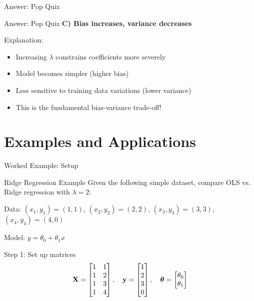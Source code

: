 \documentclass{beamer}
\begin{document}
\begin{frame}{Answer: Pop Quiz \thepopquiz}
\begin{popquizbox}{Answer: Pop Quiz \thepopquiz}
\textbf{C) Bias increases, variance decreases}

\vspace{0.3cm}
Explanation:
\begin{itemize}
\item Increasing $\lambda$ constrains coefficients more severely
\item Model becomes simpler (higher bias)
\item Less sensitive to training data variations (lower variance)
\item This is the fundamental bias-variance trade-off!
\end{itemize}
\end{popquizbox}
\end{frame}

\section{Examples and Applications}

\begin{frame}{Worked Example: Setup}
\begin{examplebox}{Ridge Regression Example}
Given the following simple dataset, compare OLS vs. Ridge regression with $\lambda = 2$:

\vspace{0.3cm}
Data: $(x_1, y_1) = (1, 1)$, $(x_2, y_2) = (2, 2)$, $(x_3, y_3) = (3, 3)$, $(x_4, y_4) = (4, 0)$

Model: $y = \theta_0 + \theta_1 x$
\end{examplebox}
\pause

\begin{codebox}{Step 1: Set up matrices}
$$\mathbf{X} = \begin{bmatrix} 1 & 1 \\ 1 & 2 \\ 1 & 3 \\ 1 & 4 \end{bmatrix}, \quad \mathbf{y} = \begin{bmatrix} 1 \\ 2 \\ 3 \\ 0 \end{bmatrix}, \quad \boldsymbol{\theta} = \begin{bmatrix} \theta_0 \\ \theta_1 \end{bmatrix}$$
\end{codebox}
\end{frame}
\end{document}
